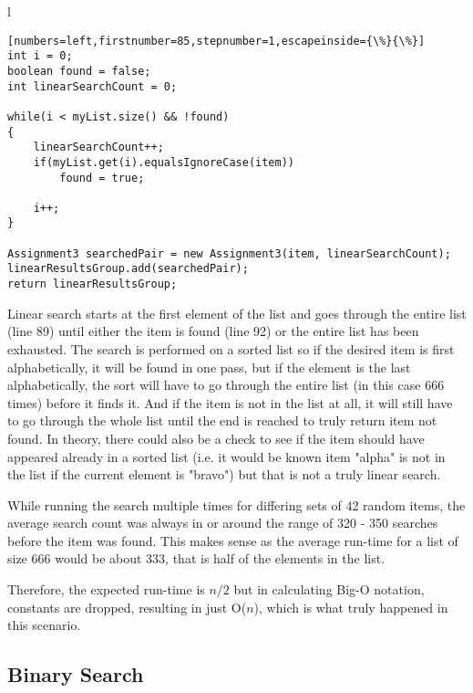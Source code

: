 \documentclass[letterpaper, 10pt,DIV=13]{scrartcl}
\numberwithin{equation}{section} %
\numberwithin{figure}{section} %
\numberwithin{table}{section} %
\begin{document}
\begin{center}
\begin{tabular}{l}
\begin{lstlisting}[numbers=left,firstnumber=85,stepnumber=1,escapeinside={\%}{\%}]
int i = 0;
boolean found = false;
int linearSearchCount = 0;

while(i < myList.size() && !found)
{
    linearSearchCount++;
    if(myList.get(i).equalsIgnoreCase(item))
        found = true;
    
    i++;
}

Assignment3 searchedPair = new Assignment3(item, linearSearchCount);
linearResultsGroup.add(searchedPair);
return linearResultsGroup;
\end{lstlisting}
\end{tabular}
\end{center}\textbf{}

Linear search starts at the first element of the list and goes through the entire list (line 89) until either the item is found (line 92) or the entire list has been exhausted.  The search is performed on a sorted list so if the desired item is first alphabetically, it will be found in one pass, but if the element is the last alphabetically, the sort will have to go through the entire list (in this case 666 times) before it finds it.  And if the item is not in the list at all, it will still have to go through the whole list until the end is reached to truly return item not found.  In theory, there could also be a check to see if the item should have appeared already in a sorted list (i.e. it would be known item "alpha" is not in the list if the current element is "bravo") but that is not a truly linear search.  

While running the search multiple times for differing sets of 42 random items, the average search count was always in or around the range of 320 - 350 searches before the item was found.  This makes sense as the average run-time for a list of size 666 would be about 333, that is half of the elements in the list.  

Therefore, the expected run-time is $n/2$ but in calculating Big-O notation, constants are dropped, resulting in just O($n$), which is what truly happened in this scenario.

\subsection{Binary Search}
\end{document}
